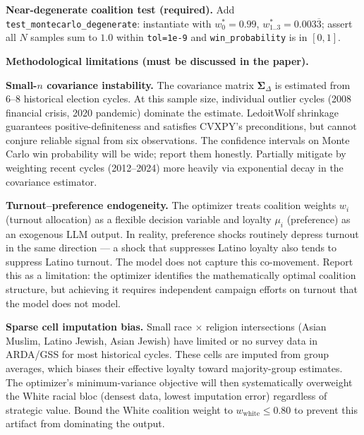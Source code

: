 \documentclass[11pt]{article}
\newcommand{\boldSigma}{\boldsymbol{\Sigma}}
\begin{document}
\textbf{Near-degenerate coalition test (required).}
Add \texttt{test\_montecarlo\_degenerate}: instantiate with $w^*_0 = 0.99$,
$w^*_{1..3} = 0.003\overline{3}$; assert all $N$ samples sum to $1.0$ within
\texttt{tol=1e-9} and \texttt{win\_probability} is in $[0, 1]$.

\textbf{Methodological limitations (must be discussed in the paper).}

\begin{mdframed}[style=warnbox]
\textbf{Small-$n$ covariance instability.}
The covariance matrix $\boldSigma_\Delta$ is estimated from 6--8 historical election
cycles. At this sample size, individual outlier cycles (2008 financial crisis, 2020
pandemic) dominate the estimate. LedoitWolf shrinkage guarantees positive-definiteness
and satisfies CVXPY's preconditions, but cannot conjure reliable signal from six
observations. The confidence intervals on Monte Carlo win probability will be wide;
report them honestly. Partially mitigate by weighting recent cycles (2012--2024)
more heavily via exponential decay in the covariance estimator.
\end{mdframed}

\begin{mdframed}[style=warnbox]
\textbf{Turnout--preference endogeneity.}
The optimizer treats coalition weights $w_i$ (turnout allocation) as a flexible
decision variable and loyalty $\mu_i$ (preference) as an exogenous LLM output.
In reality, preference shocks routinely depress turnout in the same direction ---
a shock that suppresses Latino loyalty also tends to suppress Latino turnout.
The model does not capture this co-movement. Report this as a limitation:
the optimizer identifies the mathematically optimal coalition structure, but
achieving it requires independent campaign efforts on turnout that the model
does not model.
\end{mdframed}

\begin{mdframed}[style=warnbox]
\textbf{Sparse cell imputation bias.}
Small race $\times$ religion intersections (Asian Muslim, Latino Jewish, Asian Jewish)
have limited or no survey data in ARDA/GSS for most historical cycles.
These cells are imputed from group averages, which biases their effective loyalty
toward majority-group estimates. The optimizer's minimum-variance objective will
then systematically overweight the White racial bloc (densest data, lowest imputation
error) regardless of strategic value. Bound the White coalition weight to
$w_{\text{white}} \leq 0.80$ to prevent this artifact from dominating the output.
\end{mdframed}
\end{document}
